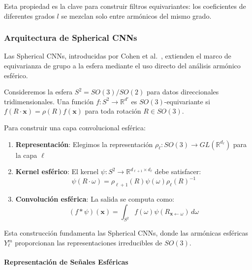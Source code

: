 Esta propiedad es la clave para construir filtros equivariantes: los coeficientes de diferentes grados $l$ se mezclan solo entre armónicos del mismo grado.

\subsubsection{Arquitectura de Spherical CNNs}

Las Spherical CNNs, introducidas por Cohen et al.~\citep{cohen2018sphericalcnns}, extienden el marco de equivarianza de grupo a la esfera mediante el uso directo del análisis armónico esférico.

\begin{example}\label{ex:spherical_equivariant_layer_cnn}
Consideremos la esfera $S^2 = SO(3)/SO(2)$ para datos direccionales tridimensionales. Una función $f: S^2 \rightarrow \mathbb{R}^{d'}$ es $SO(3)$-equivariante si $f(R \cdot \mathbf{x}) = \rho(R) f(\mathbf{x})$ para toda rotación $R \in SO(3)$.

Para construir una capa convolucional esférica:
\begin{enumerate}
    \item \textbf{Representación}: Elegimos la representación $\rho_\ell: SO(3) \rightarrow GL(\mathbb{R}^{d_\ell})$ para la capa $\ell$
    \item \textbf{Kernel esférico}: El kernel $\psi: S^2 \rightarrow \mathbb{R}^{d_{\ell+1} \times d_\ell}$ debe satisfacer:
    \begin{equation}
    \psi(R \cdot \omega) = \rho_{\ell+1}(R) \psi(\omega) \rho_\ell(R)^{-1}
    \end{equation}
    \item \textbf{Convolución esférica}: La salida se computa como:
    \begin{equation}
    (f * \psi)(\mathbf{x}) = \int_{S^2} f(\omega) \psi(R_{\mathbf{x} \leftarrow \omega}) \, d\omega
    \end{equation}
\end{enumerate}

Esta construcción fundamenta las Spherical \glspl{CNN}, donde las armónicas esféricas $Y_\ell^m$ proporcionan las representaciones irreducibles de $SO(3)$.
\end{example}

\paragraph{Representación de Señales Esféricas}

